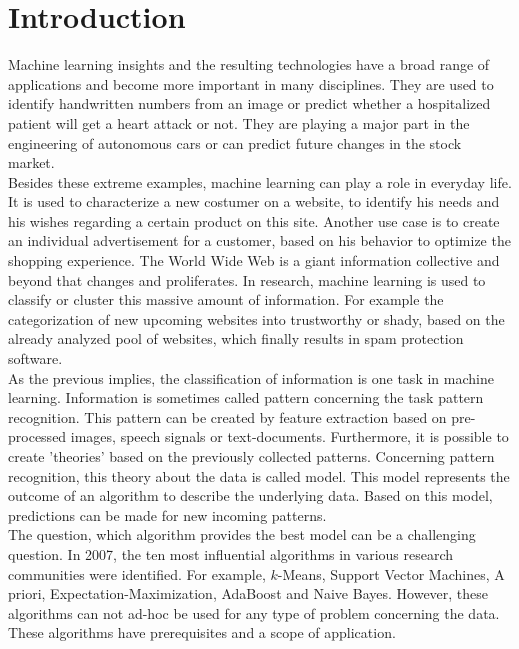 \chapter{Introduction}
Machine learning insights and the resulting technologies have a broad range of applications and become more important in many disciplines.
They are used to identify handwritten numbers from an image or predict whether a hospitalized patient will get a heart attack or not. 
They are playing a major part in the engineering of autonomous cars or can predict future changes in the stock market.\cite[p. 1]{Paluszek.2017}\cite[p. 1]{TrevorHastie.2009}\\
Besides these extreme examples, machine learning can play a role in everyday life.
It is used to characterize a new costumer on a website, to identify his needs and his wishes regarding a certain product on this site.
Another use case is to create an individual advertisement for a customer, based on his behavior to optimize the shopping experience.
The World Wide Web is a giant information collective and beyond that changes and proliferates.
In research, machine learning is used to classify or cluster this massive amount of information.
For example the categorization of new upcoming websites into trustworthy or shady, based on the already analyzed pool of websites, which finally results in spam protection software.\cite{Pan.2010}\cite{Singh.2010}\\
As the previous implies, the classification of information is one task in machine learning.
Information is sometimes called pattern concerning the task pattern recognition.
This pattern can be created by feature extraction based on pre-processed images, speech signals or text-documents.
Furthermore, it is possible to create 'theories' based on the previously collected patterns.
Concerning pattern recognition, this theory about the data is called model. 
This model represents the outcome of an algorithm to describe the underlying data.
Based on this model, predictions can be made for new incoming patterns.\cite{Theodoridis.2008}\cite[p. 2-5]{Paluszek.2017}\\
The question, which algorithm provides the best model can be a challenging question.
In 2007, the ten most influential algorithms in various research communities were identified.
For example, $k$-Means, Support Vector Machines, A priori, Expectation-Maximization, AdaBoost and Naive Bayes.
However, these algorithms can not ad-hoc be used for any type of problem concerning the data.
These algorithms have prerequisites and a scope of application.\cite{Wu.2008}\\
